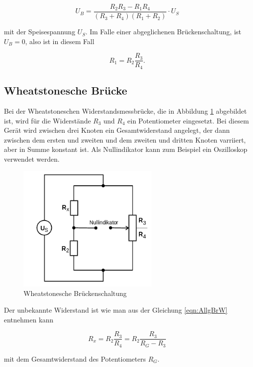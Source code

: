 \begin{equation}
  U_B = \frac{R_2R_3 - R_1R_4}{(R_3+R_4)(R_1+R_2)} \cdot U_S
  \label{eqn:Brs}
\end{equation}

mit der Speisespannung $U_S$.
Im Falle einer abgeglichenen Brückenschaltung, ist $U_B = 0$, also
ist in diesem Fall

\begin{equation}
  R_1 = R_2\frac{R_3}{R_4}.
  \label{eqn:AllgBrW}
\end{equation}


\subsection{Wheatstonesche Brücke}

Bei der Wheatstoneschen Widerstandsmessbrücke, die in Abbildung
\ref{fig:WheBr} abgebildet ist, wird für die
Widerstände $R_3$ und $R_4$ ein Potentiometer eingesetzt.
Bei diesem Gerät wird zwischen
drei Knoten ein Gesamtwiderstand angelegt, der dann zwischen dem ersten und
zweiten und dem zweiten und dritten Knoten varriiert, aber in Summe konstant
ist. Als Nullindikator kann zum Beispiel ein Oszilloskop verwendet werden.

\begin{figure}[h]
  \centering
  \includegraphics[height=6.25cm]{WheBr.png}
  \caption{Wheatstonesche Brückenschaltung \cite{anleitung}}
  \label{fig:WheBr}
\end{figure}

Der unbekannte Widerstand ist wie man aus der Gleichung
\eqref{eqn:AllgBrW} entnehmen kann

\begin{equation}
  R_x = R_2\frac{R_3}{R_4} = R_2\frac{R_3}{R_G - R_3}
\end{equation}

mit dem Gesamtwiderstand des Potentiometers $R_G$.


